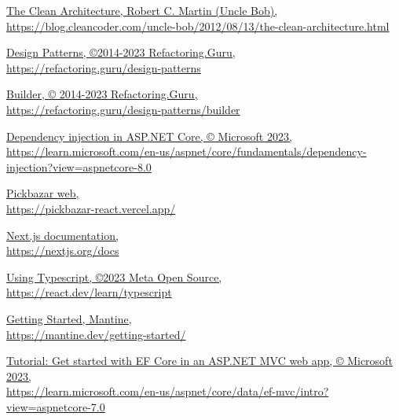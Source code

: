 \documentclass[12pt, a4paper]{report}
\theoremstyle{definition}
\begin{document}
\listoffigures
\listoftables









\begin{thebibliography}{80}
     \href{https://blog.cleancoder.com/uncle-bob/2012/08/13/the-clean-architecture.html}{\color{black}The Clean Architecture, Robert C. Martin (Uncle Bob), \\ https://blog.cleancoder.com/uncle-bob/2012/08/13/the-clean-architecture.html}

     \href{https://refactoring.guru/design-patterns}{\color{black}Design Patterns, ©2014-2023 Refactoring.Guru, \\
    https://refactoring.guru/design-patterns}
    
     \href{https://refactoring.guru/design-patterns/builder}{\color{black}Builder, © 2014-2023 Refactoring.Guru, \\
    https://refactoring.guru/design-patterns/builder}
    
     \href{https://learn.microsoft.com/en-us/aspnet/core/fundamentals/dependency-injection?view=aspnetcore-8.0}{\color{black}Dependency injection in ASP.NET Core, © Microsoft 2023, \\ https://learn.microsoft.com/en-us/aspnet/core/fundamentals/dependency-injection?view=aspnetcore-8.0}

     \href{https://pickbazar-react.vercel.app/}{\color{black}Pickbazar web, \\https://pickbazar-react.vercel.app/}

     \href{https://nextjs.org/docs}{\color{black}Next.js documentation, \\https://nextjs.org/docs}

     \href{https://react.dev/learn/typescript}{\color{black}Using Typescript, ©2023 Meta Open Source, \\https://react.dev/learn/typescript}

     \href{https://mantine.dev/getting-started/}{\color{black}Getting Started, Mantine,\\https://mantine.dev/getting-started/}

     \href{https://learn.microsoft.com/en-us/aspnet/core/data/ef-mvc/intro?view=aspnetcore-7.0}{\color{black}Tutorial: Get started with EF Core in an ASP.NET MVC web app, © Microsoft 2023, \\https://learn.microsoft.com/en-us/aspnet/core/data/ef-mvc/intro?view=aspnetcore-7.0}


\end{thebibliography}
\end{document}

